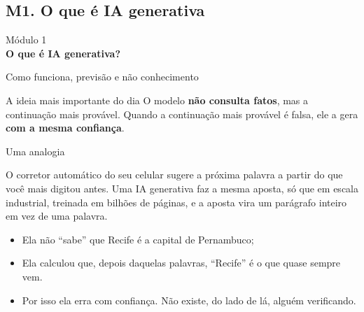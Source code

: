 \documentclass[11pt,aspectratio=169,t]{beamer}
\newcommand{\transicao}[2]{%
  \begin{frame}[plain]
    \centering
    \vspace*{2.2cm}
    {\large\color{cinzaescuro} #1}\\[0.8cm]
    {\Large\color{azulUNI}\textbf{#2}}
  \end{frame}}
\begin{document}
\subsection{M1. O que é IA generativa}
\transicao{Módulo 1}{O que é IA generativa?}
\begin{frame}{Como funciona, previsão e não conhecimento}
  \centering
  \pause
  \vfill
  \begin{alertblock}{A ideia mais importante do dia}
    O modelo \textbf{não consulta fatos}, mas a continuação mais provável. Quando a continuação mais provável é falsa, ele a gera \textbf{com a mesma confiança}.
  \end{alertblock}
\end{frame}
\begin{frame}{Uma analogia}
  \begin{block}{}
    O corretor automático do seu celular sugere a próxima palavra a partir do que você mais digitou antes. Uma IA generativa faz a mesma aposta, só que em escala industrial, treinada em bilhões de páginas, e a aposta vira um parágrafo inteiro em vez de uma palavra.
  \end{block}
  \pause
  \vfill
  \begin{itemize}
    \item Ela não ``sabe'' que Recife é a capital de Pernambuco;
    \item Ela calculou que, depois daquelas palavras, ``Recife'' é o que quase sempre vem.
    \pause
    \item \alert{Por isso ela erra com confiança. Não existe, do lado de lá, alguém verificando.}
  \end{itemize}
\end{frame}
\end{document}

